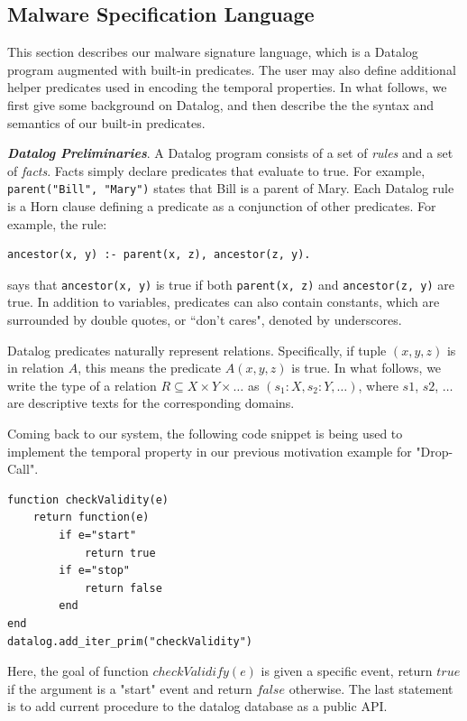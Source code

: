 \documentclass{article}
\begin{document}
\subsection{Malware Specification Language}
This section describes our malware signature language, which is a Datalog program augmented with 
built-in predicates. The user may also define 
additional helper predicates  used in encoding the temporal properties.
In what follows, we first give some background on Datalog, and then describe the 
 the syntax and semantics of our built-in predicates.


{\bf \emph{Datalog Preliminaries}}. 
A Datalog program  consists of a set of \emph{rules} and a set of \emph{facts}. 
Facts simply declare predicates that evaluate to true. For example, 
{\tt parent("Bill", "Mary")} states that Bill is a parent of Mary. Each  Datalog rule is  a Horn clause defining a predicate as a conjunction of other
predicates. For example, the  rule:

\begin{verbatim}
ancestor(x, y) :- parent(x, z), ancestor(z, y).
\end{verbatim}
\normalsize

\noindent
says that \verb+ancestor(x, y)+ is true if both \verb+parent(x, z)+ and
\verb+ancestor(z, y)+ are true. In addition to variables, predicates can 
also contain constants, 
which are surrounded by double quotes, or
``don't cares",  denoted by underscores.

Datalog predicates naturally represent relations. Specifically, if tuple $(x, y, z)$
is in relation $A$, this means the  predicate $A(x, y, z)$ is
true. In what follows, we write the type of a relation $R \subseteq X \times Y \times \ldots$ as $(s_1 : X, s_2 : Y, \ldots)$, where
$s1$, $s2$, $\ldots$ are descriptive texts for the corresponding domains.

Coming back to our system, the following code snippet is being used to implement the temporal
property in our previous motivation example for "Drop-Call".

\begin{verbatim}
function checkValidity(e)
    return function(e)
        if e="start"
            return true
        if e="stop"
            return false
        end
end
datalog.add_iter_prim("checkValidity")
\end{verbatim}
\normalsize

Here, the goal of function $checkValidify(e)$ is given a specific event, return $true$
if the argument is a "start" event and return $false$ otherwise. The last statement is to
add current procedure to the datalog database as a public API. 
\end{document}
